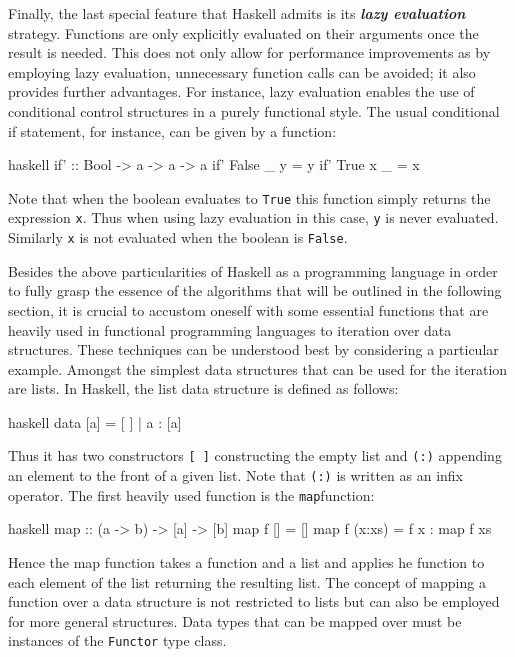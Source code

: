 Finally, the last special feature that Haskell admits is its \textit{\textbf{lazy evaluation}} strategy. Functions are only explicitly evaluated on their arguments once the result is needed. This does not only allow for performance improvements as by employing lazy evaluation, unnecessary function calls can be avoided; it also provides further advantages. For instance, lazy evaluation enables the use of conditional control structures in a purely functional style. The usual conditional if statement, for instance, can be given by a function:
\begin{center}
\begin{cminted}{haskell}
if' :: Bool -> a -> a -> a
if' False _ y = y 
if' True x _ = x 
\end{cminted}
\end{center}
Note that when the boolean evaluates to \texttt{True} this function simply returns the expression \texttt{x}. Thus when using lazy evaluation in this case, \texttt{y} is never evaluated. Similarly \texttt{x} is not evaluated when the boolean is \texttt{False}. 

Besides the above particularities of Haskell as a programming language in order to fully grasp the essence of the algorithms that will be outlined in the following section, it is crucial to accustom oneself with some essential functions that are heavily used in functional programming languages to iteration over data structures. These techniques can be understood best by considering a particular example. Amongst the simplest data structures that can be used for the iteration are lists. In Haskell, the list data structure is defined as follows: 
\begin{center}
\begin{cminted}{haskell}
data [a] = [ ] | a : [a] 
\end{cminted}
\end{center}
Thus it has two constructors \texttt{[ ]} constructing the empty list and \texttt{(:)} appending an element to the front of a given list. Note that \texttt{(:)} is written as an infix operator.
The first heavily used function is the \texttt{map}function:
\begin{center}
\begin{cminted}{haskell}
map :: (a -> b) -> [a] -> [b]
map f [] = [] 
map f (x:xs) =  f x : map f xs 
\end{cminted}
\end{center}
Hence the map function takes a function and a list and applies he function to each element of the list returning the resulting list.
The concept of mapping a function over a data structure is not restricted to lists but can also be employed for more general structures. Data types that can be mapped over must be instances of the \texttt{Functor} type class.


